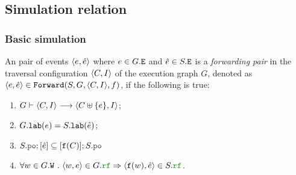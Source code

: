 \documentclass[12pt]{article}
\begin{document}
\subsection{Simulation relation}

\subsubsection{Basic simulation}

\begin{definition}
  An pair of events $\langle e, \hat{e} \rangle$ where $e \in G.{\mathtt{E}}$ and $\hat{e} \in S.{\mathtt{E}}$
  is a \emph{forwarding pair} in
  the traversal configuration $\langle C, I \rangle$ of the \imm execution graph $G$,
  denoted as $\langle e, \hat{e} \rangle \in {\mathtt{Forward}}(S, G, \langle C, I \rangle, f)$, if the following is true:
  \begin{enumerate}[label=\textbf{F.\arabic*}]

    \item \label{item:frwd-coverable}
      $G \vdash \langle C, I \rangle \longrightarrow \langle C \uplus \{e\}, I \rangle$;
     
    \item \label{item:frwd-lab}
      $G.{\mathtt{lab}}(e) = S.{\mathtt{lab}}(\hat{e})$;

    \item \label{item:frwd-front}
      $S.\lPO;[\hat{e}] \subseteq [\lf(C)];S.\lPO$

    \item \label{item:frwd-rf}
      $\forall{w \in G.\lW} ~.~ \tup{w, e} \in G.\lRF \Rightarrow \tup{\lf(w), \hat{e}} \in S.\lRF$.

  \end{enumerate}
\end{definition}
\end{document}
